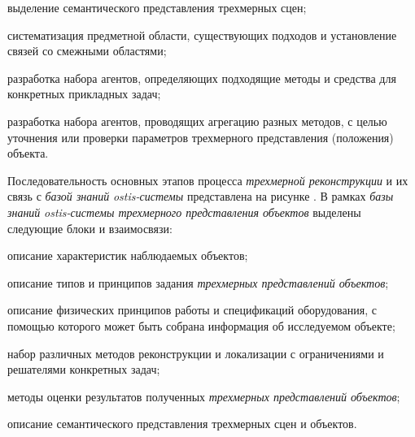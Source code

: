 \begin{textitemize}
    \item выделение семантического представления трехмерных сцен;
    \item систематизация предметной области, существующих подходов и установление связей со смежными областями;
    \item разработка набора агентов, определяющих подходящие методы и средства для конкретных прикладных задач;
    \item разработка набора агентов, проводящих агрегацию разных методов, с целью уточнения или проверки параметров трехмерного представления (положения) объекта.
\end{textitemize}

Последовательность основных этапов процесса \textit{трехмерной реконструкции} и их связь с \textit{базой знаний} \textit{ostis-системы} представлена на рисунке \textit{}. В рамках \textit{базы знаний} \textit{ostis-системы трехмерного представления объектов} выделены следующие блоки и взаимосвязи:

\begin{textitemize}
    \item описание характеристик наблюдаемых объектов;
    \item описание типов и принципов задания \textit{трехмерных представлений объектов};
    \item описание физических принципов работы и спецификаций оборудования, с помощью которого может быть собрана информация об исследуемом объекте;
    \item набор различных методов реконструкции и локализации с ограничениями и решателями конкретных задач;
    \item методы оценки результатов полученных \textit{трехмерных представлений объектов};
    \item описание семантического представления трехмерных сцен и объектов.
\end{textitemize}

